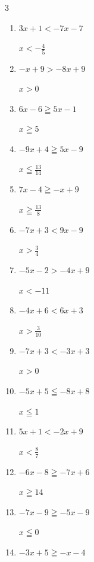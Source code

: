 \begin{multicols}{3}
\begin{enumerate}
        $\displaystyle x\leqq \frac{1}{15}$

  \item $3x+1<-7x-7$

        $\displaystyle x<-\frac{4}{5}$

  \item $-x+9>-8x+9$

        $\displaystyle x>0$

  \item $6x-6\geqq 5x-1$

        $\displaystyle x\geqq 5$

  \item $-9x+4\geqq 5x-9$

        $\displaystyle x\leqq \frac{13}{14}$

  \item $7x-4\geqq -x+9$

        $\displaystyle x\geqq \frac{13}{8}$

  \item $-7x+3<9x-9$

        $\displaystyle x>\frac{3}{4}$

  \item $-5x-2>-4x+9$

        $\displaystyle x<-11$

  \item $-4x+6<6x+3$

        $\displaystyle x>\frac{3}{10}$

\columnbreak %

\resetques

  \item $-7x+3<-3x+3$

        $\displaystyle x>0$

  \item $-5x+5\leqq -8x+8$

        $\displaystyle x\leqq 1$

  \item $5x+1<-2x+9$

        $\displaystyle x<\frac{8}{7}$

  \item $-6x-8\geqq -7x+6$

        $\displaystyle x\geqq 14$

  \item $-7x-9\geqq -5x-9$

        $\displaystyle x\leqq 0$

  \item $-3x+5\geqq -x-4$


\end{enumerate}
\end{multicols}
